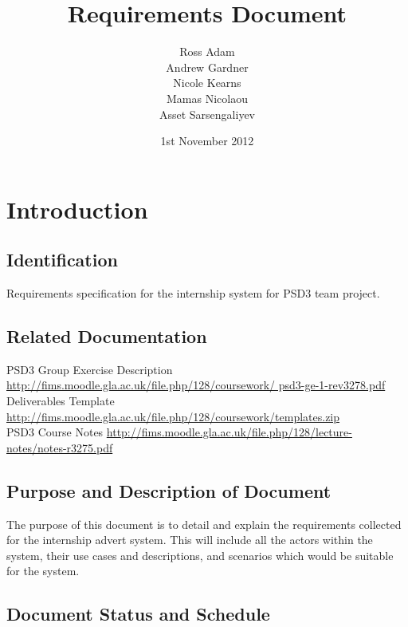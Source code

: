 \documentclass{l3deliverable}
\title{Requirements Document}
\author{Ross Adam\\
Andrew Gardner\\
Nicole Kearns\\
Mamas Nicolaou\\
Asset Sarsengaliyev\\
}
\date{1st November 2012}
\begin{document}
\maketitle
\tableofcontents
\newpage
\section{Introduction}

\subsection{Identification}

Requirements specification for the internship system for PSD3 team project.
\subsection{Related Documentation}

PSD3 Group Exercise Description \url{http://fims.moodle.gla.ac.uk/file.php/128/coursework/
psd3-ge-1-rev3278.pdf}\\
Deliverables Template \url{http://fims.moodle.gla.ac.uk/file.php/128/coursework/templates.zip}\\
PSD3 Course Notes \url{http://fims.moodle.gla.ac.uk/file.php/128/lecture-notes/notes-r3275.pdf}
\\
\subsection{Purpose and Description of Document}

The purpose of this document is to detail and explain the requirements collected for the
internship advert system. This will include all the actors within the system, their use cases and
descriptions, and scenarios which would be suitable for the system.

\subsection{Document Status and Schedule}
\end{document}
